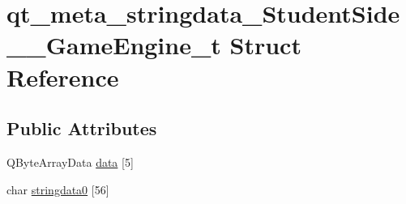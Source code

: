 \hypertarget{structqt__meta__stringdata___student_side_____game_engine__t}{\section{qt\-\_\-meta\-\_\-stringdata\-\_\-\-Student\-Side\-\_\-\-\_\-\-Game\-Engine\-\_\-t Struct Reference}
\label{structqt__meta__stringdata___student_side_____game_engine__t}
}
\subsection*{Public Attributes}
\begin{DoxyCompactItemize}
\item 
Q\-Byte\-Array\-Data \hyperlink{structqt__meta__stringdata___student_side_____game_engine__t_aa6366f6e71cef2c92fa62156715535e6}{data} \mbox{[}5\mbox{]}
\item 
char \hyperlink{structqt__meta__stringdata___student_side_____game_engine__t_ab37bb3a2060f5e5cdfb8c0b067c220db}{stringdata0} \mbox{[}56\mbox{]}
\end{DoxyCompactItemize}


